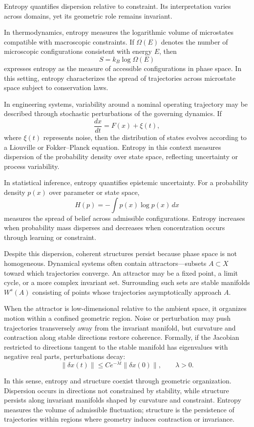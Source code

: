 \documentclass[12pt]{book}
\begin{document}
Entropy quantifies dispersion relative to constraint. Its interpretation varies across domains, yet its geometric role remains invariant.

In thermodynamics, entropy measures the logarithmic volume of microstates compatible with macroscopic constraints. If $\Omega(E)$ denotes the number of microscopic configurations consistent with energy $E$, then
\[
S = k_B \log \Omega(E)
\]
expresses entropy as the measure of accessible configurations in phase space. In this setting, entropy characterizes the spread of trajectories across microstate space subject to conservation laws.

In engineering systems, variability around a nominal operating trajectory may be described through stochastic perturbations of the governing dynamics. If
\[
\frac{dx}{dt} = F(x) + \xi(t),
\]
where $\xi(t)$ represents noise, then the distribution of states evolves according to a Liouville or Fokker--Planck equation. Entropy in this context measures dispersion of the probability density over state space, reflecting uncertainty or process variability.

In statistical inference, entropy quantifies epistemic uncertainty. For a probability density $p(x)$ over parameter or state space,
\[
H(p) = - \int p(x) \log p(x)\, dx
\]
measures the spread of belief across admissible configurations. Entropy increases when probability mass disperses and decreases when concentration occurs through learning or constraint.

Despite this dispersion, coherent structures persist because phase space is not homogeneous. Dynamical systems often contain attractors---subsets $A \subset X$ toward which trajectories converge. An attractor may be a fixed point, a limit cycle, or a more complex invariant set. Surrounding such sets are stable manifolds $W^s(A)$ consisting of points whose trajectories asymptotically approach $A$.

When the attractor is low-dimensional relative to the ambient space, it organizes motion within a confined geometric region. Noise or perturbation may push trajectories transversely away from the invariant manifold, but curvature and contraction along stable directions restore coherence. Formally, if the Jacobian restricted to directions tangent to the stable manifold has eigenvalues with negative real parts, perturbations decay:
\[
\|\delta x(t)\| \le C e^{-\lambda t} \|\delta x(0)\|,
\qquad \lambda > 0.
\]

In this sense, entropy and structure coexist through geometric organization. Dispersion occurs in directions not constrained by stability, while structure persists along invariant manifolds shaped by curvature and constraint. Entropy measures the volume of admissible fluctuation; structure is the persistence of trajectories within regions where geometry induces contraction or invariance.
\end{document}
